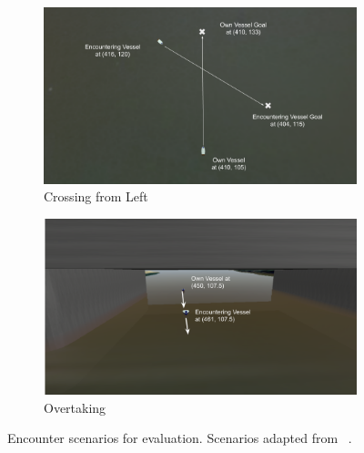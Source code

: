\begin{figure}[H]
        \begin{subfigure}[b]{0.495\textwidth}
            \centering
            \includegraphics[width=\textwidth]{figs/Chap5/simulation_uwsim_crossingleft_starting_pos.png}
            \caption{Crossing from Left}
            \label{fig:simulation_uwsim_crossingleft_starting_pos}
        \end{subfigure}
        \begin{subfigure}[b]{0.495\textwidth}
            \centering
            \includegraphics[width=\textwidth]{figs/Chap5/simulation_uwsim_overtake_starting_pos.png}
            \caption{Overtaking}
            \label{fig:simulation_uwsim_overtake_starting_pos}
        \end{subfigure}
    
    \caption{Encounter scenarios for evaluation. Scenarios adapted from ~\cite{Huang2019Generalized}.}
    \label{fig:simulation_uwsim_encounters}
    \end{figure}


